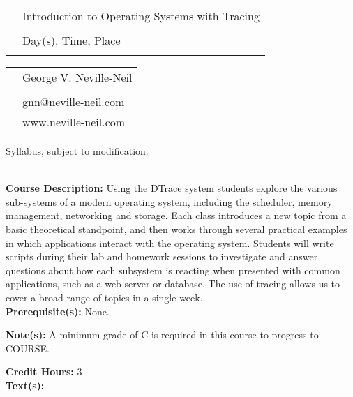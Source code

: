 \documentclass[11pt]{article}
\begin{document}
\begin{tabular}{ l l }
  & \LARGE Introduction to Operating Systems with Tracing \\\\
  & \LARGE Day(s), Time, Place \\\\
\end{tabular}
\vspace{10mm}

\begin{tabular}{ l l }
  & \large George V. Neville-Neil \\\\
  & \large gnn@neville-neil.com \\
  & \large www.neville-neil.com \\
\end{tabular}
\vspace{5mm}
\begin{center} Syllabus, subject to modification. \\
\end{center}

\textbf {\large \\ Course Description:} Using the DTrace system
students explore the various sub-systems of a modern operating system,
including the scheduler, memory management, networking and storage.
Each class introduces a new topic from a basic theoretical standpoint,
and then works through several practical examples in which
applications interact with the operating system.  Students will write
scripts during their lab and homework sessions to investigate and
answer questions about how each subsystem is reacting when presented
with common applications, such as a web server or database.  The use
of tracing allows us to cover a broad range of topics in a single
week.
\\
\textbf {Prerequisite(s):} None.

\textbf {Note(s):} A minimum grade of C is required in this course to progress to COURSE. 

\textbf {Credit Hours:} 3 \\

\textbf {\large Text(s):}
\end{document}
